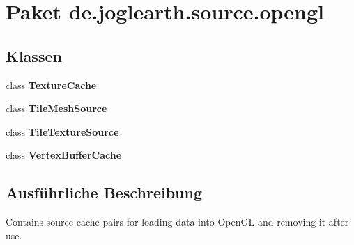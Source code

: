 \section{Paket de.\-joglearth.\-source.\-opengl}
\label{namespacede_1_1joglearth_1_1source_1_1opengl}
\subsection*{Klassen}
\begin{DoxyCompactItemize}
\item 
class {\bf Texture\-Cache}
\item 
class {\bf Tile\-Mesh\-Source}
\item 
class {\bf Tile\-Texture\-Source}
\item 
class {\bf Vertex\-Buffer\-Cache}
\end{DoxyCompactItemize}


\subsection{Ausführliche Beschreibung}
Contains source-\/cache pairs for loading data into Open\-G\-L and removing it after use. 
